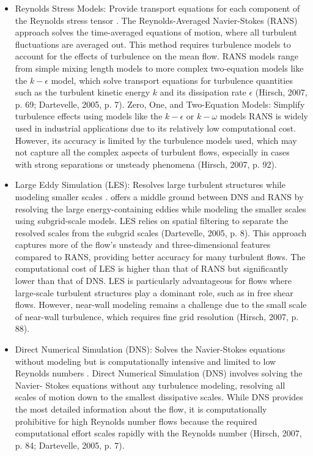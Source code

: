 \begin{itemize}
    \item Reynolds Stress Models: Provide transport equations for each component of the Reynolds stress 
    tensor . The Reynolds-Averaged Navier-Stokes (RANS) approach solves the time-averaged 
    equations of motion, where all turbulent fluctuations are averaged out. This method requires turbulence models 
    to account for the effects of turbulence on the mean flow. RANS models range from simple mixing length models to 
    more complex two-equation models like the $k- \epsilon$ model, which solve transport equations for turbulence quantities 
    such as the turbulent kinetic energy $k$ and its dissipation rate $\epsilon$ (Hirsch, 2007, p. 69; Dartevelle, 2005, p. 7).
    Zero, One, and Two-Equation Models: Simplify turbulence effects using models like the $k-\epsilon$ or $k-\omega$ models 
    RANS is widely used in industrial applications due to its relatively low computational cost. However, 
    its accuracy is limited by the turbulence models used, which may not capture all the complex 
    aspects of turbulent flows, especially in cases with strong separations or unsteady phenomena (Hirsch, 2007, p. 92).
    \item Large Eddy Simulation (LES): Resolves large turbulent structures while modeling smaller scales . 
    offers a middle ground between DNS and RANS by resolving the large energy-containing eddies while modeling the smaller 
    scales using subgrid-scale models. LES relies on spatial filtering to separate the resolved scales from the 
    subgrid scales (Dartevelle, 2005, p. 8). This approach captures more of the flow's unsteady and three-dimensional 
    features compared to RANS, providing better accuracy for many turbulent flows.
    The computational cost of LES is higher than that of RANS but significantly lower than that of DNS. LES is 
    particularly advantageous for flows where large-scale turbulent structures play a dominant role, such as in 
    free shear flows. However, near-wall modeling remains a challenge due to the small scale of near-wall turbulence, 
    which requires fine grid resolution (Hirsch, 2007, p. 88).
    \item Direct Numerical Simulation (DNS): Solves the Navier-Stokes equations without modeling but is computationally intensive and 
        limited to low Reynolds numbers . Direct Numerical Simulation (DNS) involves solving the Navier-
        Stokes equations without any turbulence modeling, resolving all scales of motion down to the smallest dissipative scales. 
        While DNS provides the most detailed information about the flow, it is computationally prohibitive for high Reynolds 
        number flows because the required computational effort scales rapidly with the Reynolds number (Hirsch, 2007, p. 84; 
        Dartevelle, 2005, p. 7).
\end{itemize}
